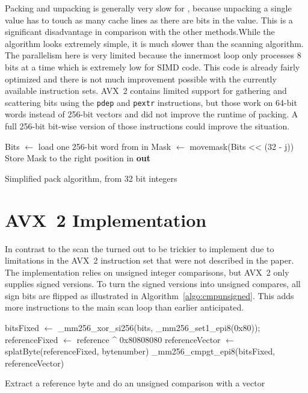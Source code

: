 Packing and unpacking is generally very slow for \bwv{}, because unpacking a
single value has to touch as many cache lines as there are bits in the value.
This is a significant disadvantage in comparison with the other methods.While
the algorithm looks extremely simple, it is much slower than the scanning
algorithm.  The parallelism here is very limited because the innermost loop only
processes 8 bits at a time which is extremely low for SIMD code. This code is
already fairly optimized and there is not much improvement possible with the
currently available instruction sets. AVX~2 contains limited support for
gathering and scattering bits using the \texttt{pdep} and \texttt{pextr}
instructions, but those work on 64-bit words instead of 256-bit vectors and did
not improve the runtime of packing. A full 256-bit bit-wise version of those
instructions could improve the situation.

\begin{algorithm}[h]
\begin{algorithmic}[1]
      \State Bits $\gets$ load one 256-bit word from in
        \State Mask $\gets$ movemask(Bits << (32 - j)) 
        \State Store Mask to the right position in \textbf{out}
      \EndFor
    \EndFor
  \EndFor
  \EndProcedure
\end{algorithmic}
\caption{Simplified \bwv{} pack algorithm, from 32 bit integers}
\label{algo:packbwv}
\end{algorithm}

\section{AVX~2 \bs{} Implementation}

In contrast to the \bwv{} scan the \bs{} turned out to be trickier to implement
due to limitations in the AVX~2 instruction set that were not described in the
\bs{} paper. The implementation relies on unsigned integer comparisons, but AVX~2
only supplies signed versions. To turn the signed versions into unsigned
compares, all sign bits are flipped as illustrated in
Algorithm~\ref{algo:cmpunsigned}. This adds more instructions to the main scan
loop than earlier anticipated.

\begin{algorithm}[h]
\begin{algorithmic}[1]
  \State bitsFixed $\gets$ \_mm256\_xor\_si256(bits, \_mm256\_set1\_epi8(0x80));
  \State referenceFixed $\gets$ reference \^{} 0x80808080
  \State referenceVector $\gets$ splatByte(referenceFixed, bytenumber)
  \State \Return \_mm256\_cmpgt\_epi8(bitsFixed, referenceVector)
  \EndProcedure
\end{algorithmic}
\caption{Extract a reference byte and do an unsigned comparison with a vector}
\label{algo:cmpunsigned}
\end{algorithm}

